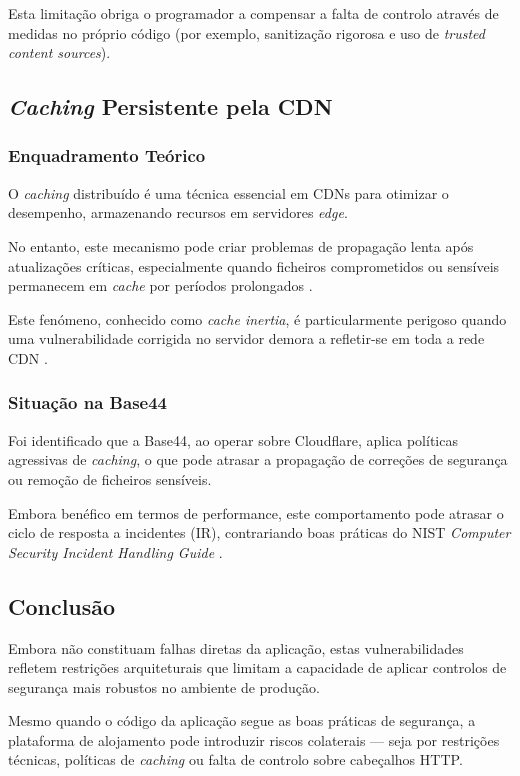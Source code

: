 Esta limitação obriga o programador a compensar a falta de controlo através de medidas no próprio código (por exemplo, sanitização rigorosa e uso de \textit{trusted content sources}).

\subsection{\textit{Caching} Persistente pela CDN}

\subsubsection{Enquadramento Teórico}

O \textit{caching} distribuído é uma técnica essencial em CDNs para otimizar o desempenho, armazenando recursos em servidores \textit{edge}.

No entanto, este mecanismo pode criar problemas de propagação lenta após atualizações críticas, especialmente quando ficheiros comprometidos ou sensíveis permanecem em \textit{cache} por períodos prolongados \cite{ref26}.

Este fenómeno, conhecido como \textit{cache inertia}, é particularmente perigoso quando uma vulnerabilidade corrigida no servidor demora a refletir-se em toda a rede CDN \cite{ref27}.

\subsubsection{Situação na Base44}

Foi identificado que a Base44, ao operar sobre Cloudflare, aplica políticas agressivas de \textit{caching}, o que pode atrasar a propagação de correções de segurança ou remoção de ficheiros sensíveis.

Embora benéfico em termos de performance, este comportamento pode atrasar o ciclo de resposta a incidentes (IR), contrariando boas práticas do NIST \textit{Computer Security Incident Handling Guide} \cite{ref28}.

\subsection{Conclusão}

Embora não constituam falhas diretas da aplicação, estas vulnerabilidades refletem restrições arquiteturais que limitam a capacidade de aplicar controlos de segurança mais robustos no ambiente de produção.

Mesmo quando o código da aplicação segue as boas práticas de segurança, a plataforma de alojamento pode introduzir riscos colaterais — seja por restrições técnicas, políticas de \textit{caching} ou falta de controlo sobre cabeçalhos HTTP.

